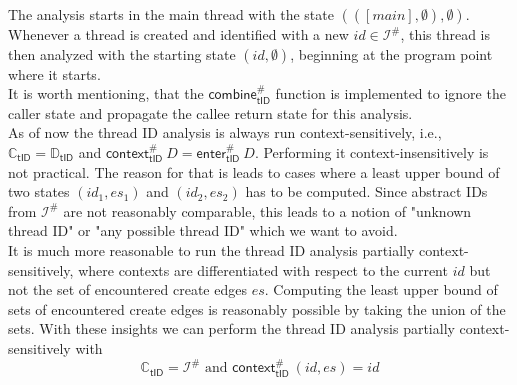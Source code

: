   The analysis starts in the main thread with the state $(([main], \emptyset), \emptyset)$. Whenever a thread is created and identified with a new $id \in \mathcal{I}^{\#}$, this thread is then analyzed with the starting state $(id, \emptyset)$, beginning at the program point where it starts.\\
  It is worth mentioning, that the $\textsf{combine}^{\#}_\textsf{tID}$ function is implemented to ignore the caller state and propagate the callee return state for this analysis.
  \\
  As of now the thread ID analysis is always run context-sensitively, i.e., $\mathbb{C}_\textsf{tID} = \mathbb{D}_\textsf{tID}$ and $\textsf{context}^{\#}_\textsf{tID}\ D = \textsf{enter}^{\#}_\textsf{tID}\ D$. Performing it context-insensitively is not practical. The reason for that is leads to cases where a least upper bound of two states $(id_1, es_1)$ and $(id_2, es_2)$ has to be computed. Since abstract IDs from $\mathcal{I}^{\#}$ are not reasonably comparable, this leads to a notion of "unknown thread ID" or "any possible thread ID" which we want to avoid.\\
  It is much more reasonable to run the thread ID analysis partially context-sensitively, where contexts are differentiated with respect to the current $id$ but not the set of encountered create edges $es$. Computing the least upper bound of sets of encountered create edges is reasonably possible by taking the union of the sets. With these insights we can perform the thread ID analysis partially context-sensitively with
  \[\mathbb{C}_\textsf{tID} = \mathcal{I}^{\#} \text{ and } \textsf{context}^{\#}_\textsf{tID}\ (id, es) = id\]
